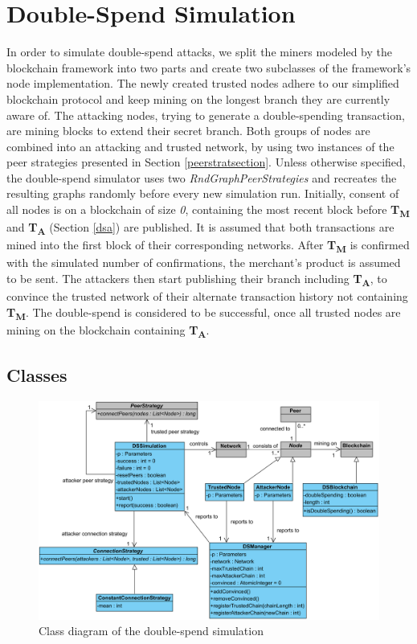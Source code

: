 \documentclass[a4paper,12pt,twoside]{report}
\begin{document}
\section{Double-Spend Simulation}
In order to simulate double-spend attacks, we split the miners modeled by the blockchain framework into two parts and create two subclasses of the framework's node implementation. The newly created trusted nodes adhere to our simplified blockchain protocol and keep mining on the longest branch they are currently aware of. The attacking nodes, trying to generate a double-spending transaction, are mining blocks to extend their secret branch. Both groups of nodes are combined into an attacking and trusted network, by using two instances of the peer strategies presented in Section \ref{peerstratsection}. Unless otherwise specified, the double-spend simulator uses two \textit{RndGraphPeerStrategies} and recreates the resulting graphs randomly before every new simulation run. Initially, consent of all nodes is on a blockchain of size \textit{0}, containing the most recent block before \textbf{T\textsubscript{M}} and \textbf{T\textsubscript{A}} (Section \ref{dsa}) are published. It is assumed that both transactions are mined into the first block of their corresponding networks. After \textbf{T\textsubscript{M}} is confirmed with the simulated number of confirmations, the merchant's product is assumed to be sent. The attackers then start publishing their branch including \textbf{T\textsubscript{A}}, to convince the trusted network of their alternate transaction history not containing \textbf{T\textsubscript{M}}. The double-spend is considered to be successful, once all trusted nodes are mining on the blockchain containing \textbf{T\textsubscript{A}}.
\subsection{Classes}
\begin{figure}
	\centering
  \includegraphics[width=\textwidth]{Simulation.png}
	\caption{Class diagram of the double-spend simulation}
	\label{simulation}
\end{figure}
\end{document}
